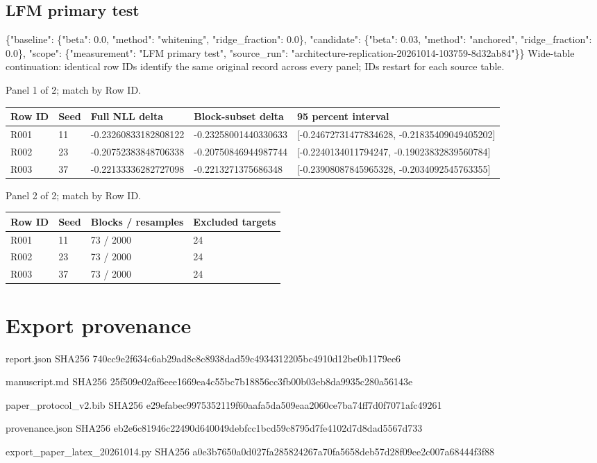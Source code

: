\documentclass[10pt]{article}
\begin{document}
\subsection{LFM primary test}
\{"baseline": \{"beta": 0.0, "method": "whitening", "ridge\_fraction": 0.0\}, "candidate": \{"beta": 0.03, "method": "anchored", "ridge\_fraction": 0.0\}, "scope": \{"measurement": "LFM primary test", "source\_run": "architecture-replication-20261014-103759-8d32ab84"\}\}
Wide-table continuation: identical row IDs identify the same original record across every panel; IDs restart for each source table.
\par\noindent Panel 1 of 2; match by Row ID.
{\scriptsize\setlength{\tabcolsep}{2pt}
\begin{longtable}{p{}p{}p{}p{}p{}}
Row ID & Seed & Full NLL delta & Block-subset delta & 95 percent interval \\
\hline\endhead
R001 & 11 & -0.23260833182808122 & -0.23258001440330633 & [-0.24672731477834628, -0.21835409049405202] \\
R002 & 23 & -0.20752383848706338 & -0.20750846944987744 & [-0.2240134011794247, -0.19023832839560784] \\
R003 & 37 & -0.22133336282727098 & -0.2213271375686348 & [-0.23908087845965328, -0.2034092545763355] \\
\end{longtable}}
\par\noindent Panel 2 of 2; match by Row ID.
{\scriptsize\setlength{\tabcolsep}{2pt}
\begin{longtable}{p{}p{}p{}p{}}
Row ID & Seed & Blocks / resamples & Excluded targets \\
\hline\endhead
R001 & 11 & 73 / 2000 & 24 \\
R002 & 23 & 73 / 2000 & 24 \\
R003 & 37 & 73 / 2000 & 24 \\
\end{longtable}}
\section{Export provenance}
\par\noindent\small report.json SHA256 740cc9e2f634c6ab29ad8c8c8938dad59c4934312205bc4910d12be0b1179ee6
\par\noindent\small manuscript.md SHA256 25f509e02af6eee1669ea4c55bc7b18856cc3fb00b03eb8da9935c280a56143e
\par\noindent\small paper\_protocol\_v2.bib SHA256 e29efabec9975352119f60aafa5da509eaa2060ce7ba74ff7d0f7071afc49261
\par\noindent\small provenance.json SHA256 eb2e6c81946c22490d640049debfcc1bcd59c8795d7fe4102d7d8dad5567d733
\par\noindent\small export\_paper\_latex\_20261014.py SHA256 a0e3b7650a0d027fa285824267a70fa5658deb57d28f09ee2c007a68444f3f88
\end{document}
